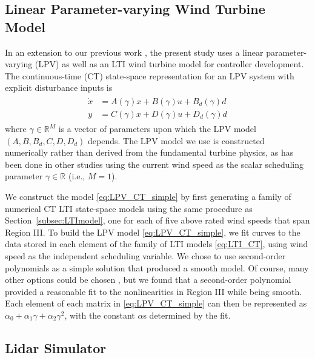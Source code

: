 \documentclass[letterpaper, 10 pt, conference]{ieeeconf}  %
\begin{document}
\subsection{Linear Parameter-varying Wind Turbine Model}

In an extension to our previous work \cite{Sinner2018}, the present study uses a linear parameter-varying (LPV) as well as an LTI wind turbine model for controller development. The continuous-time (CT) state-space representation for an LPV system with explicit disturbance inputs is
\begin{align}\label{eq:LPV_CT_simple}
\begin{split}
\dot{x} &= A(\gamma)x + B(\gamma)u + B_d(\gamma)d \\
y &= C(\gamma)x + D(\gamma)u + D_d(\gamma)d
\end{split}
\end{align}
where $\gamma \in \mathbb{R}^M$ is a vector of parameters upon which the LPV model $(A,B,B_d,C,D,D_d)$ depends. The LPV model we use is constructed numerically rather than derived from the fundamental turbine physics, as has been done in other studies \cite{Bottasso2014}\cite{Soltani2011} using the current wind speed as the scalar scheduling parameter $\gamma \in \mathbb{R}$ (i.e., $M=1$).

We construct the model \eqref{eq:LPV_CT_simple} by first generating a family of numerical CT LTI state-space models using the same procedure as Section~\ref{subsec:LTImodel}, one for each of five above rated wind speeds that span Region III. To build the LPV model \eqref{eq:LPV_CT_simple}, we fit curves to the data stored in each element of the family of LTI models \eqref{eq:LTI_CT}, using wind speed as the independent scheduling variable. We chose to use second-order polynomials as a simple solution that produced a smooth model. Of course, many other options could be chosen \cite{Ossmann2017}, but we found that a second-order polynomial provided a reasonable fit to the nonlinearities in Region III while being smooth. Each element of each matrix in \eqref{eq:LPV_CT_simple} can then be represented as $\alpha_0 + \alpha_1 \gamma + \alpha_2 \gamma^2$, with the constant $\alpha$s determined by the fit.

\subsection{Lidar Simulator}
\end{document}
